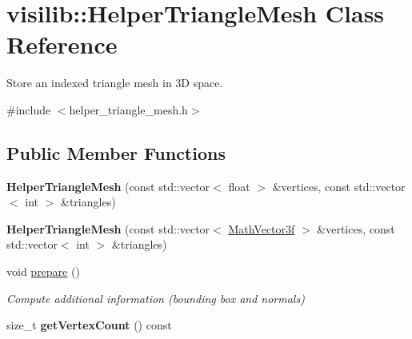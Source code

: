 \hypertarget{classvisilib_1_1_helper_triangle_mesh}{}\section{visilib\+::Helper\+Triangle\+Mesh Class Reference}
\label{classvisilib_1_1_helper_triangle_mesh}


Store an indexed triangle mesh in 3D space.  




{\ttfamily \#include $<$helper\+\_\+triangle\+\_\+mesh.\+h$>$}

\subsection*{Public Member Functions}
\begin{DoxyCompactItemize}
\item 
\mbox{\label{classvisilib_1_1_helper_triangle_mesh_af3d85f5b9db0f7da8a4c7e56f27d1994}} 
{\bfseries Helper\+Triangle\+Mesh} (const std\+::vector$<$ float $>$ \&vertices, const std\+::vector$<$ int $>$ \&triangles)
\item 
\mbox{\label{classvisilib_1_1_helper_triangle_mesh_afb5452ae562c39ee3b56dfd2d774b270}} 
{\bfseries Helper\+Triangle\+Mesh} (const std\+::vector$<$ \mbox{\hyperlink{classvisilib_1_1_math_vector3__}{Math\+Vector3f}} $>$ \&vertices, const std\+::vector$<$ int $>$ \&triangles)
\item 
\mbox{\label{classvisilib_1_1_helper_triangle_mesh_a075a6a388607a78ec69f21562b43e4c2}} 
void \mbox{\hyperlink{classvisilib_1_1_helper_triangle_mesh_a075a6a388607a78ec69f21562b43e4c2}{prepare}} ()
\begin{DoxyCompactList}\small\item\em Compute additional information (bounding box and normals) \end{DoxyCompactList}\item 
\mbox{\label{classvisilib_1_1_helper_triangle_mesh_a187c48eb8aec67ff7aac9f3d7aceaa8c}} 
size\+\_\+t {\bfseries get\+Vertex\+Count} () const
\item 
\mbox{\label{classvisilib_1_1_helper_triangle_mesh_a44733fc657f2b6e5f8bfd50e214c8424}} 

\end{DoxyCompactItemize}
